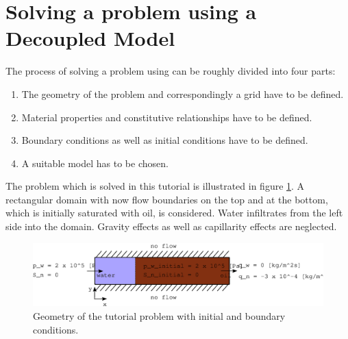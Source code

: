 \clearpage
\section[Decoupled model]{Solving a problem using a Decoupled Model}\label{tutorial-decoupled}

The process of solving a problem using \Dumux can be roughly divided into four parts: 
\begin{enumerate}
 \item The geometry of the problem and correspondingly a grid have to be defined.
 \item Material properties and constitutive relationships have to be defined.
 \item Boundary conditions as well as initial conditions have to be defined.
 \item A suitable model has to be chosen.
\end{enumerate}

The problem which is solved in this tutorial is illustrated in figure \ref{tutorial-decoupled:problemfigure}. A rectangular domain with now flow boundaries on the top and at the bottom, which is initially saturated with oil, is considered. Water infiltrates from the left side into the domain. Gravity effects as well as capillarity effects are neglected.

\begin{figure}[h]
\centering
\includegraphics[width=0.9\linewidth,keepaspectratio]{EPS/tutorial-problemconfiguration}
\caption{Geometry of the tutorial problem with initial and boundary conditions.}\label{tutorial-decoupled:problemfigure}
\end{figure}

